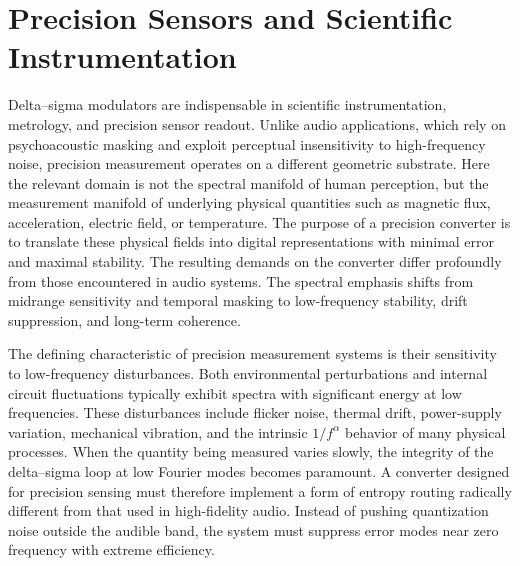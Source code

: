 
\chapter{Precision Sensors and Scientific Instrumentation}

Delta–sigma modulators are indispensable in scientific instrumentation, metrology, and precision sensor readout. Unlike audio applications, which rely on psychoacoustic masking and exploit perceptual insensitivity to high-frequency noise, precision measurement operates on a different geometric substrate. Here the relevant domain is not the spectral manifold of human perception, but the measurement manifold of underlying physical quantities such as magnetic flux, acceleration, electric field, or temperature. The purpose of a precision converter is to translate these physical fields into digital representations with minimal error and maximal stability. The resulting demands on the converter differ profoundly from those encountered in audio systems. The spectral emphasis shifts from midrange sensitivity and temporal masking to low-frequency stability, drift suppression, and long-term coherence.

The defining characteristic of precision measurement systems is their sensitivity to low-frequency disturbances. Both environmental perturbations and internal circuit fluctuations typically exhibit spectra with significant energy at low frequencies. These disturbances include flicker noise, thermal drift, power-supply variation, mechanical vibration, and the intrinsic \(1/f^\alpha\) behavior of many physical processes. When the quantity being measured varies slowly, the integrity of the delta–sigma loop at low Fourier modes becomes paramount. A converter designed for precision sensing must therefore implement a form of entropy routing radically different from that used in high-fidelity audio. Instead of pushing quantization noise outside the audible band, the system must suppress error modes near zero frequency with extreme efficiency.

